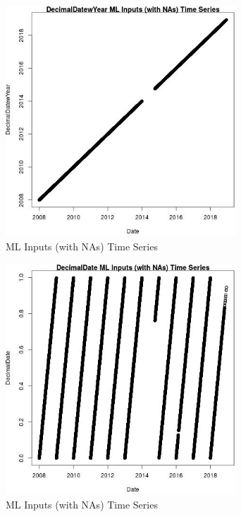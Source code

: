 \begin{figure} 
\centering  
\includegraphics[width=0.77\textwidth]{Code_Outputs/Report_ML_input_PM25_Step4_part_e_de_duplicated_aveswNAs_DecimalDatewYearvDate.jpg} 
\caption{\label{fig:Report_ML_input_PM25_Step4_part_e_de_duplicated_aveswNAsDecimalDatewYearvDate}ML Inputs (with NAs) Time Series} 
\end{figure} 
 

\begin{figure} 
\centering  
\includegraphics[width=0.77\textwidth]{Code_Outputs/Report_ML_input_PM25_Step4_part_e_de_duplicated_aveswNAs_DecimalDatevDate.jpg} 
\caption{\label{fig:Report_ML_input_PM25_Step4_part_e_de_duplicated_aveswNAsDecimalDatevDate}ML Inputs (with NAs) Time Series} 
\end{figure} 
 
